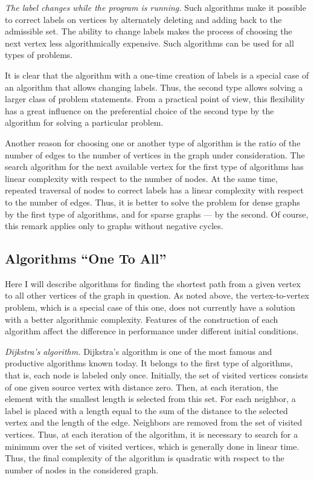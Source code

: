     \textit{The label changes while the program is running.}
    Such algorithms make it possible to correct labels on vertices by alternately deleting and adding back to the admissible set.
    The ability to change labels makes the process of choosing the next vertex less algorithmically expensive.
    Such algorithms can be used for all types of problems.
    
    It is clear that the algorithm with a one-time creation of labels is a special case of an algorithm that allows changing labels.
    Thus, the second type allows solving a larger class of problem statements.
    From a practical point of view, this flexibility has a great influence on the preferential choice of the second type by the algorithm for solving a particular problem.
    
    Another reason for choosing one or another type of algorithm is the ratio of the number of edges to the number of vertices in the graph under consideration.
    The search algorithm for the next available vertex for the first type of algorithms has linear complexity with respect to the number of nodes.
    At the same time, repeated traversal of nodes to correct labels has a linear complexity with respect to the number of edges.
    Thus, it is better to solve the problem for dense graphs by the first type of algorithms, and for sparse graphs --- by the second.
    Of course, this remark applies only to graphs without negative cycles.


    \subsection{Algorithms ``One To All''}
    Here I will describe algorithms for finding the shortest path from a given vertex to all other vertices of the graph in question.
    As noted above, the vertex-to-vertex problem, which is a special case of this one, does not currently have a solution with a better algorithmic complexity.
    Features of the construction of each algorithm affect the difference in performance under different initial conditions.
    
    \textit{Dijkstra's algorithm.}
    Dijkstra's algorithm is one of the most famous and productive algorithms known today.
    It belongs to the first type of algorithms, that is, each node is labeled only once.
    Initially, the set of visited vertices consists of one given source vertex with distance zero.
    Then, at each iteration, the element with the smallest length is selected from this set.
    For each neighbor, a label is placed with a length equal to the sum of the distance to the selected vertex and the length of the edge.
    Neighbors are removed from the set of visited vertices.
    Thus, at each iteration of the algorithm, it is necessary to search for a minimum over the set of visited vertices, which is generally done in linear time.
    Thus, the final complexity of the algorithm is quadratic with respect to the number of nodes in the considered graph.

